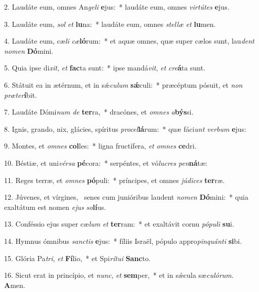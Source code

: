 2. Laudáte eum, omnes An\textit{ge}\textit{li} \textbf{e}jus:~*  laudáte eum, omnes \textit{vir}\textit{tú}\textit{tes} \textbf{e}jus.\

3. Laudáte eum, \textit{sol} \textit{et} \textbf{lu}na:~*  laudáte eum, omnes \textit{stel}\textit{læ} \textit{et} \textbf{lu}men.\

4. Laudáte eum, cæ\textit{li} \textit{cæ}\textbf{ló}rum:~*  et aquæ omnes, quæ super cælos sunt, lau\textit{dent} \textit{no}\textit{men} \textbf{Dó}mini.\

5. Quia ipse di\textit{xit}, \textit{et} \textbf{fac}ta sunt:~*  ipse mandá\textit{vit}, \textit{et} \textit{cre}\textbf{á}ta sunt.\

6. Státuit ea in ætérnum, et in sǽ\textit{cu}\textit{lum} \textbf{sǽ}culi:~*  præcéptum pósuit, et \textit{non} \textit{præ}\textit{ter}\textbf{í}bit.\

7. Laudáte Dómi\textit{num} \textit{de} \textbf{ter}ra,~*  dracónes, et \textit{om}\textit{nes} \textit{a}\textbf{býs}si.\

8. Ignis, grando, nix, glácies, spíritus \textit{pro}\textit{cel}\textbf{lá}rum:~*  quæ fáci\textit{unt} \textit{ver}\textit{bum} \textbf{e}jus:\

9. Montes, et \textit{om}\textit{nes} \textbf{col}les:~*  ligna fructífera, \textit{et} \textit{om}\textit{nes} \textbf{ce}dri.\

10. Béstiæ, et uni\textit{vér}\textit{sa} \textbf{pé}cora:~*  serpéntes, et vó\textit{lu}\textit{cres} \textit{pen}\textbf{ná}tæ:\

11. Reges terræ, et \textit{om}\textit{nes} \textbf{pó}puli:~*  príncipes, et omnes \textit{jú}\textit{di}\textit{ces} \textbf{ter}ræ.\

12. Júvenes, et vírgines, \dag\  senes cum junióribus laudent \textit{no}\textit{men} \textbf{Dó}mini:~*  quia exaltátum est nomen \textit{e}\textit{jus} \textit{so}\textbf{lí}us.\

13. Conféssio ejus super cæ\textit{lum} \textit{et} \textbf{ter}ram:~*  et exaltávit cornu \textit{pó}\textit{pu}\textit{li} \textbf{su}i.\

14. Hymnus ómnibus \textit{sanc}\textit{tis} \textbf{e}jus:~*  fíliis Israël, pópulo appro\textit{pin}\textit{quán}\textit{ti} \textbf{si}bi.\

15. Glória Pa\textit{tri}, \textit{et} \textbf{Fí}lio,~*  et Spi\textit{rí}\textit{tu}\textit{i} \textbf{Sanc}to.\

16. Sicut erat in princípio, et \textit{nunc}, \textit{et} \textbf{sem}per,~*  et in sǽcula sæ\textit{cu}\textit{ló}\textit{rum}. \textbf{A}men.\

